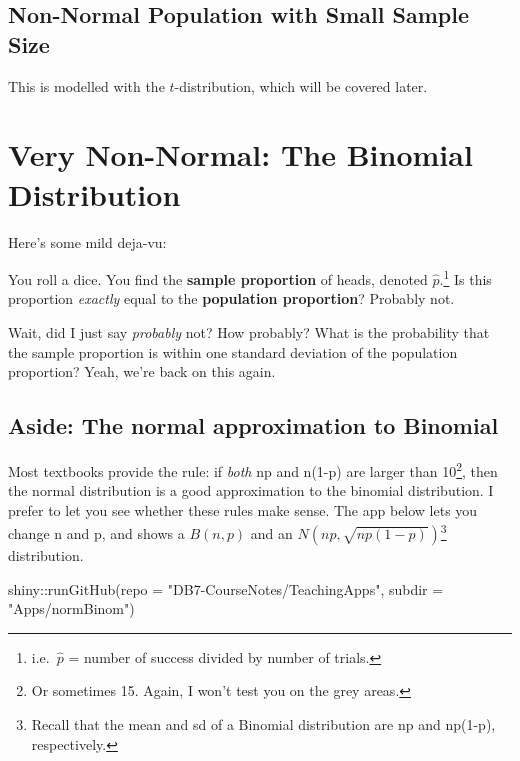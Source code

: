 \documentclass[
  letterpaper,
  DIV=11,
  numbers=noendperiod,
  oneside]{scrreprt}
\newenvironment{Shaded}{\begin{snugshade}}{\end{snugshade}}
\newcommand{\AttributeTok}[1]{\textcolor[rgb]{0.40,0.45,0.13}{#1}}
\newcommand{\FunctionTok}[1]{\textcolor[rgb]{0.28,0.35,0.67}{#1}}
\newcommand{\NormalTok}[1]{\textcolor[rgb]{0.00,0.23,0.31}{#1}}
\newcommand{\SpecialCharTok}[1]{\textcolor[rgb]{0.37,0.37,0.37}{#1}}
\newcommand{\StringTok}[1]{\textcolor[rgb]{0.13,0.47,0.30}{#1}}
\begin{document}
\hypertarget{non-normal-population-with-small-sample-size}{%
\subsection{Non-Normal Population with Small Sample
Size}\label{non-normal-population-with-small-sample-size}}

This is modelled with the \(t\)-distribution, which will be covered
later.

\hypertarget{very-non-normal-the-binomial-distribution}{%
\section{Very Non-Normal: The Binomial
Distribution}\label{very-non-normal-the-binomial-distribution}}

Here's some mild deja-vu:

You roll a dice. You find the \textbf{sample proportion} of heads,
denoted \(\hat p\).\footnote{i.e.~\(\hat p\) = number of success divided
  by number of trials.} Is this proportion \emph{exactly} equal to the
\textbf{population proportion}? Probably not.

Wait, did I just say \emph{probably} not? How probably? What is the
probability that the sample proportion is within one standard deviation
of the population proportion? Yeah, we're back on this again.

\hypertarget{aside-the-normal-approximation-to-binomial}{%
\subsection{Aside: The normal approximation to
Binomial}\label{aside-the-normal-approximation-to-binomial}}

Most textbooks provide the rule: if \emph{both} np and n(1-p) are larger
than 10\footnote{Or sometimes 15. Again, I won't test you on the grey
  areas.}, then the normal distribution is a good approximation to the
binomial distribution. I prefer to let you see whether these rules make
sense. The app below lets you change n and p, and shows a \(B(n, p)\)
and an \(N(np, \sqrt{np(1-p)})\)\footnote{Recall that the mean and sd of
  a Binomial distribution are np and np(1-p), respectively.}
distribution.

\begin{Shaded}
\begin{Highlighting}[]
\NormalTok{shiny}\SpecialCharTok{::}\FunctionTok{runGitHub}\NormalTok{(}\AttributeTok{repo =} \StringTok{"DB7{-}CourseNotes/TeachingApps"}\NormalTok{, }
    \AttributeTok{subdir =} \StringTok{"Apps/normBinom"}\NormalTok{)}
\end{Highlighting}
\end{Shaded}
\end{document}
